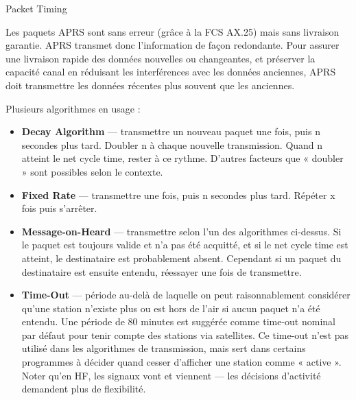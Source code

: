 \begin{aprssideblock}{Packet Timing}
\label{packet-timing}
Les paquets APRS sont sans erreur (grâce à la FCS AX.25) mais sans
livraison garantie. APRS transmet donc l'information de façon
redondante. Pour assurer une livraison rapide des données nouvelles ou
changeantes, et préserver la capacité canal en réduisant les
interférences avec les données anciennes, APRS doit transmettre les
données récentes plus souvent que les anciennes.

Plusieurs algorithmes en usage :

\begin{itemize}
\tightlist
\item
  \textbf{Decay Algorithm} --- transmettre un nouveau paquet une fois,
  puis n secondes plus tard. Doubler n à chaque nouvelle transmission.
  Quand n atteint le net cycle time, rester à ce rythme. D'autres
  facteurs que « doubler » sont possibles selon le contexte.
\item
  \textbf{Fixed Rate} --- transmettre une fois, puis n secondes plus
  tard. Répéter x fois puis s'arrêter.
\item
  \textbf{Message-on-Heard} --- transmettre selon l'un des algorithmes
  ci-dessus. Si le paquet est toujours valide et n'a pas été acquitté,
  et si le net cycle time est atteint, le destinataire est probablement
  absent. Cependant si un paquet du destinataire est ensuite entendu,
  réessayer une fois de transmettre.
\item
  \textbf{Time-Out} --- période au-delà de laquelle on peut
  raisonnablement considérer qu'une station n'existe plus ou est hors
  de l'air si aucun paquet n'a été entendu. Une période de 80 minutes
  est suggérée comme time-out nominal par défaut pour tenir compte des
  stations via satellites. Ce time-out n'est pas utilisé dans les
  algorithmes de transmission, mais sert dans certains programmes à
  décider quand cesser d'afficher une station comme « active ». Noter
  qu'en HF, les signaux vont et viennent --- les décisions d'activité
  demandent plus de flexibilité.
\end{itemize}
\end{aprssideblock}

